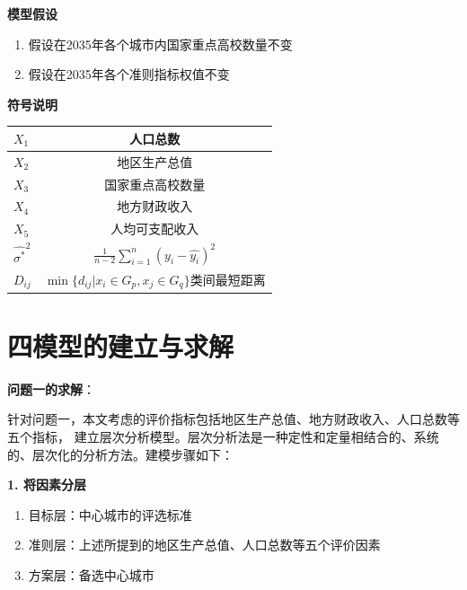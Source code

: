 \documentclass[openany,oneside]{ctexbook}
\begin{document}
\begin{center}
  \bf{模型假设}
\end{center}

\begin{enumerate}
  \item 假设在2035年各个城市内国家重点高校数量不变
  \item 假设在2035年各个准则指标权值不变
\end{enumerate}

\begin{center}
  \bf{符号说明}
\end{center}

\begin{table}[!htp]
  \centering
  \begin{tabular}{|l|c|}
    \hline
    $X_1$&人口总数 \\ \hline
    $X_2$&地区生产总值 \\ \hline
    $X_3$&国家重点高校数量 \\ \hline
    $X_4$&地方财政收入 \\ \hline
    $X_5$&人均可支配收入 \\ \hline
    $\hat{{\sigma}^*}^2$&$\displaystyle\frac{1}{n-2}\displaystyle\sum_{i=1}^{n}{(y_i-\hat{y_i})}^2$\\ \hline
    
    $D_{ij}$&$\min\{d_{ij}|x_{i} \in G_p,x_j \in G_q\}$类间最短距离 \\ \hline
  
  
  
   \end{tabular}
\end{table}


\chapter{\sihao\hei 四\quad 模型的建立与求解}

{\bfseries 问题一的求解}：

针对问题一，本文考虑的评价指标包括地区生产总值、地方财政收入、人口总数等五个指标，
建立层次分析模型。层次分析法是一种定性和定量相结合的、系统的、层次化的分析方法。建模步骤如下：



{\bfseries 1. 将因素分层}

\begin{enumerate}
   \item 目标层：中心城市的评选标准
   \item 准则层：上述所提到的地区生产总值、人口总数等五个评价因素
   \item 方案层：备选中心城市
\end{enumerate}
\end{document}
